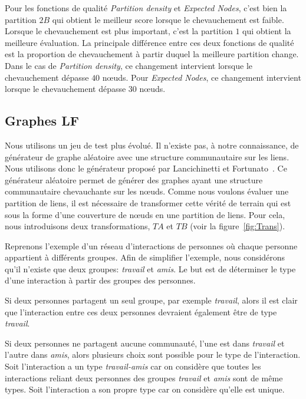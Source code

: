 Pour les fonctions de qualité \emph{Partition density} et \emph{Expected Nodes}, c'est bien la partition $2B$ qui obtient le meilleur score lorsque le chevauchement est faible.
Lorsque le chevauchement est plus important, c'est la partition $1$ qui obtient la meilleure évaluation.
La principale différence entre ces deux fonctions de qualité est la proportion de chevauchement à partir duquel la meilleure partition change.
Dans le cas de \emph{Partition density}, ce changement intervient lorsque le chevauchement dépasse $40$ n\oe{}uds.
Pour \emph{Expected Nodes}, ce changement intervient lorsque le chevauchement dépasse $30$ n\oe{}uds.

\subsection{Graphes LF}
Nous utilisons un jeu de test plus évolué.
Il n'existe pas, à notre connaissance, de générateur de graphe aléatoire avec une structure communautaire sur les liens.
Nous utilisons donc le générateur proposé par Lancichinetti et Fortunato~\cite{Lancichinetti2009b}.
Ce générateur aléatoire permet de générer des graphes ayant une structure communautaire chevauchante sur les n\oe{}uds.
Comme nous voulons évaluer une partition de liens, il est nécessaire de transformer cette vérité de terrain qui est sous la forme d'une couverture de n\oe{}uds en une partition de liens.
Pour cela, nous introduisons deux transformations, $TA$ et $TB$ (voir la figure~\ref{fig:Trans}).


Reprenons l'exemple d'un réseau d'interactions de personnes où chaque personne appartient à différents groupes.
Afin de simplifier l'exemple, nous considérons qu'il n'existe que deux groupes: \emph{travail} et \emph{amis}.
Le but est de déterminer le type d'une interaction à partir des groupes des personnes.

Si deux personnes partagent un seul groupe, par exemple \emph{travail}, alors il est clair que l'interaction entre ces deux personnes devraient également être de type \emph{travail}.

Si deux personnes ne partagent aucune communauté, l'une est dans \emph{travail} et l'autre dans \emph{amis}, alors plusieurs choix sont possible pour le type de l'interaction.
Soit l'interaction a un type \emph{travail-amis} car on considère que toutes les interactions reliant deux personnes des groupes \emph{travail} et \emph{amis} sont de même types.
Soit l'interaction a son propre type car on considère qu'elle est unique.

